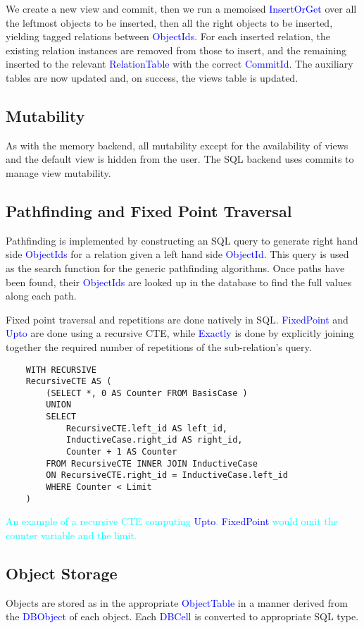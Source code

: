 \documentclass[12pt,a4paper,twoside,openright]{report}
\newcommand\codeName[1]{\textcolor{blue}{#1}}
\newcommand\note[1]{\textcolor{cyan}{#1}}
\begin{document}
{{	We create a new view and commit, then we run a memoised \codeName{InsertOrGet} over all the leftmost objects to be inserted, then all the right objects to be inserted, yielding tagged relations between \codeName{ObjectIds}. For each inserted relation, the existing relation instances are removed from those to insert, and the remaining inserted to the relevant \codeName{RelationTable} with the correct \codeName{CommitId}. The auxiliary tables are now updated and, on success, the views table is updated.

	\subsection{Mutability}
	As with the memory backend, all mutability except for the availability of views and the default view is hidden from the user. The SQL backend uses commits to manage view mutability.
	\subsection{Pathfinding and Fixed Point Traversal}
Pathfinding is implemented by constructing an SQL query to generate right hand side \codeName{ObjectIds} for a relation given a left hand side \codeName{ObjectId}. This query is used as the search function for the generic pathfinding algorithms. Once paths have been found, their \codeName{ObjectIds} are looked up in the database to find the full values along each path.

Fixed point traversal and repetitions are done natively in SQL. \codeName{FixedPoint} and \codeName{Upto} are done using a recursive CTE, while \codeName{Exactly} is done by explicitly joining together the required number of repetitions of the sub-relation's query.	
	\begin{framed}
	\begin{verbatim}
	WITH RECURSIVE
    RecursiveCTE AS (
    	(SELECT *, 0 AS Counter FROM BasisCase )
    	UNION
    	SELECT 
    		RecursiveCTE.left_id AS left_id,
    		InductiveCase.right_id AS right_id,
    		Counter + 1 AS Counter
    	FROM RecursiveCTE INNER JOIN InductiveCase
    	ON RecursiveCTE.right_id = InductiveCase.left_id
    	WHERE Counter < Limit
    )
	\end{verbatim}
	\note{An example of a recursive CTE computing \codeName{Upto}. \codeName{FixedPoint} would omit the counter variable and the limit.}
	\end{framed}
	
	\subsection{Object Storage}
	Objects are stored as in the appropriate \codeName{ObjectTable} in a manner derived from the \codeName{DBObject} of each object. Each \codeName{DBCell} is converted to appropriate SQL type.

}}
\end{document}
